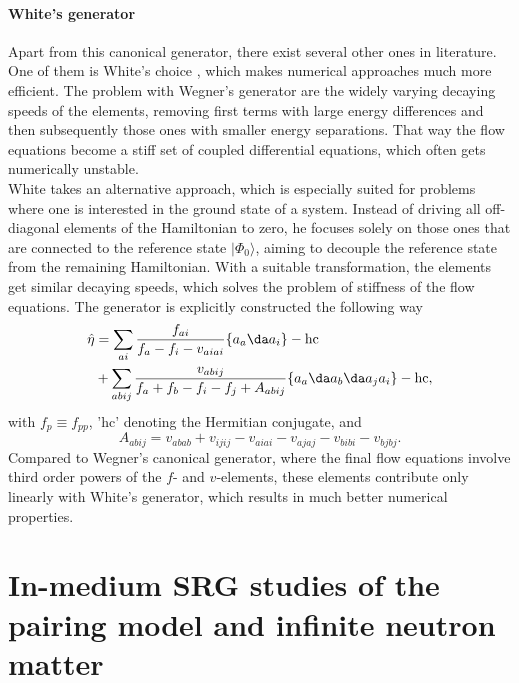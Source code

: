 \paragraph*{White's generator}
Apart from this canonical generator, there exist several other ones in
literature. One of them is White's choice
\cite{White:cond-mat0201346}, which makes numerical approaches much
more efficient.  The problem with Wegner's generator are the widely
varying decaying speeds of the elements, removing first terms with
large energy differences and then subsequently those ones with smaller
energy separations.  That way the flow equations become a stiff set of
coupled differential equations, which often gets numerically
unstable.\\ White takes an alternative approach, which is especially
suited for problems where one is interested in the ground state of a
system. Instead of driving all off-diagonal elements of the
Hamiltonian to zero, he focuses solely on those ones that are
connected to the reference state $|\Phi_0\rangle$, aiming to decouple
the reference state from the remaining Hamiltonian. With a suitable
transformation, the elements get similar decaying speeds, which solves
the problem of stiffness of the flow equations.  The generator is
explicitly constructed the following way
\cite{PhysRevLett.106.222502,White:cond-mat0201346}
\begin{align}
\hat{\eta} &= \sum_{ai} \frac{f_{ai}}{f_a-f_i-v_{aiai}}\lbrace a_a\da a_i\rbrace -\text{hc} \notag \\ & + \sum_{abij}
\frac{v_{abij}}{f_a+f_b-f_i-f_j+A_{abij}}\lbrace a_a\da a_b\da a_j
a_i\rbrace - \text{hc},
\label{eq:WhiteFull}
\end{align}
with $f_p \equiv f_{pp}$, 'hc' denoting the Hermitian conjugate, and
\[
A_{abij} = v_{abab} + v_{ijij} - v_{aiai} - v_{ajaj} - v_{bibi} -
v_{bjbj}.
\label{eq:White7}
\]
Compared to Wegner's canonical generator, where the final flow
equations involve third order powers of the $f$- and $v$-elements,
these elements contribute only linearly with White's generator, which
results in much better numerical properties.







\section{In-medium SRG studies of the pairing model and infinite neutron matter}

